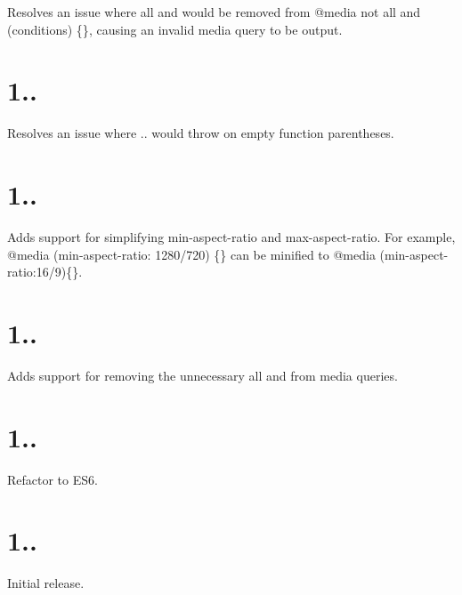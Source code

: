 
\begin{DoxyItemize}
\item Resolves an issue where {\ttfamily all and} would be removed from {\ttfamily @media not all and (conditions) \{\}}, causing an invalid media query to be output.
\end{DoxyItemize}

\section*{1..}


\begin{DoxyItemize}
\item Resolves an issue where {..} would throw on empty function parentheses.
\end{DoxyItemize}

\section*{1..}


\begin{DoxyItemize}
\item Adds support for simplifying {\ttfamily min-\/aspect-\/ratio} and {\ttfamily max-\/aspect-\/ratio}. For example, {\ttfamily @media (min-\/aspect-\/ratio\+: 1280/720) \{\}} can be minified to {\ttfamily @media (min-\/aspect-\/ratio\+:16/9)\{\}}.
\end{DoxyItemize}

\section*{1..}


\begin{DoxyItemize}
\item Adds support for removing the unnecessary {\ttfamily all and} from media queries.
\end{DoxyItemize}

\section*{1..}


\begin{DoxyItemize}
\item Refactor to E\+S6.
\end{DoxyItemize}

\section*{1..}


\begin{DoxyItemize}
\item Initial release. 
\end{DoxyItemize}